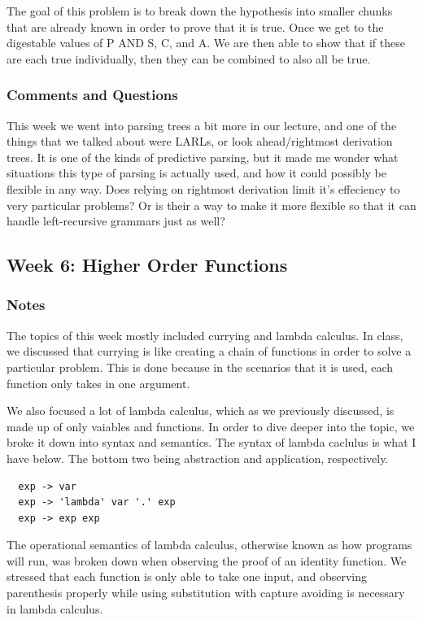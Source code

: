 \documentclass{article}
\theoremstyle{theorem}
\theoremstyle{definition}
\theoremstyle{remark}
\begin{document}
The goal of this problem is to break down the hypothesis into smaller chunks that are
already known in order to prove that it is true. Once we get to the digestable values
of P AND S, C, and A. We are then able to show that if these are each true individually,
then they can be combined to also all be true.

\subsubsection*{Comments and Questions}
This week we went into parsing trees a bit more in our lecture, and one of the 
things that we talked about were LARLs, or look ahead/rightmost derivation trees.
It is one of the kinds of predictive parsing, but it made me wonder what situations
this type of parsing is actually used, and how it could possibly be flexible in any way. 
Does relying on rightmost derivation limit it's effeciency to very particular problems?
Or is their a way to make it more flexible so that it can handle left-recursive 
grammars just as well?
\subsection{Week 6: Higher Order Functions}
\subsubsection*{Notes}
The topics of this week mostly included currying and lambda calculus. In class, we discussed that currying is like
creating a chain of functions in order to solve a particular problem. This is done because in the scenarios 
that it is used, each function only takes in one argument. 

We also focused a lot of lambda calculus, which as we previously discussed, is made up of only vaiables 
and functions. In order to dive deeper into the topic, we broke it down into syntax and semantics. 
The syntax of lambda caclulus is what I have below. The bottom two being abstraction and application, respectively.
\begin{lstlisting}
  exp -> var
  exp -> 'lambda' var '.' exp
  exp -> exp exp 
\end{lstlisting}

The operational semantics of lambda calculus, otherwise known as how programs will run, was broken down 
when observing the proof of an identity function. We stressed that each function is only able to take
one input, and observing parenthesis properly while using substitution with capture avoiding is necessary
in lambda calculus.
\end{document}
